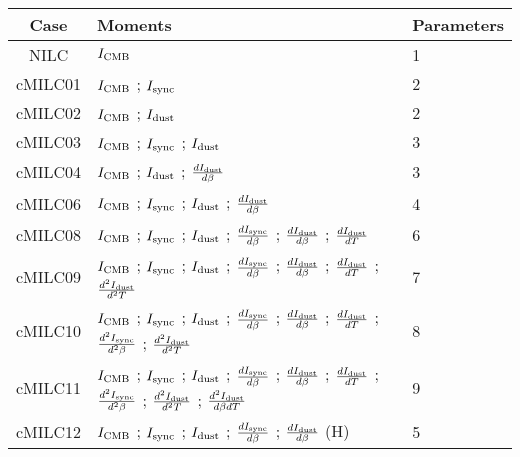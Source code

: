 \begin{tabular}{cll}
\toprule
    Case &                                                                                                                                                                                                                                                                  Moments &  Parameters \\
\midrule
 NILC &  $I_{\rm CMB}$ &  1 \\
 cMILC01 &  $I_{\rm CMB}$ ; $I_{\rm sync}$ &  2 \\
 cMILC02 &  $I_{\rm CMB}$ ; $I_{\rm dust}$ &  2 \\
 cMILC03 &  $I_{\rm CMB}$ ; $I_{\rm sync}$ ; $I_{\rm dust}$ &  3 \\
 cMILC04 &  $I_{\rm CMB}$ ; $I_{\rm dust}$ ; $\frac{d I_{\rm dust}}{d \beta}$ &  3 \\
 cMILC06 &  $I_{\rm CMB}$ ; $I_{\rm sync}$ ; $I_{\rm dust}$ ; $\frac{d I_{\rm dust}}{d \beta}$ &  4 \\
 cMILC08 &  $I_{\rm CMB}$ ; $I_{\rm sync}$ ; $I_{\rm dust}$ ; $\frac{d I_{\rm sync}}{d \beta}$ ; $\frac{d I_{\rm dust}}{d \beta}$ ; $\frac{d I_{\rm dust}}{d T}$ &  6 \\
 cMILC09 &  $I_{\rm CMB}$ ; $I_{\rm sync}$ ; $I_{\rm dust}$ ; $\frac{d I_{\rm sync}}{d \beta}$ ; $\frac{d I_{\rm dust}}{d \beta}$ ; $\frac{d I_{\rm dust}}{d T}$ ; $\frac{d^2 I_{\rm dust}}{d^2 T}$ &  7 \\
 cMILC10 &  $I_{\rm CMB}$ ; $I_{\rm sync}$ ; $I_{\rm dust}$ ; $\frac{d I_{\rm sync}}{d \beta}$ ; $\frac{d I_{\rm dust}}{d \beta}$ ; $\frac{d I_{\rm dust}}{d T}$ ; $\frac{d^2 I_{\rm sync}}{d^2 \beta}$ ; $\frac{d^2 I_{\rm dust}}{d^2 T}$ &  8 \\
 cMILC11 &  $I_{\rm CMB}$ ; $I_{\rm sync}$ ; $I_{\rm dust}$ ; $\frac{d I_{\rm sync}}{d \beta}$ ; $\frac{d I_{\rm dust}}{d \beta}$ ; $\frac{d I_{\rm dust}}{d T}$ ; $\frac{d^2 I_{\rm sync}}{d^2 \beta}$ ; $\frac{d^2 I_{\rm dust}}{d^2 T}$ ; $\frac{d^2 I_{\rm dust}}{d \beta d T}$ &  9 \\
 cMILC12 &  $I_{\rm CMB}$ ; $I_{\rm sync}$ ; $I_{\rm dust}$ ; $\frac{d I_{\rm sync}}{d \beta}$ ; $\frac{d I_{\rm dust}}{d \beta}$ (H) &  5 \\
\bottomrule
\end{tabular}
